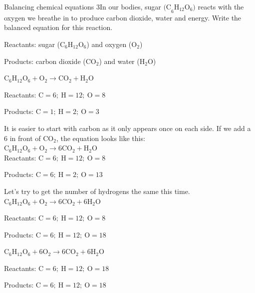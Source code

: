 \begin{wex}{Balancing chemical equations 3}{In our bodies, sugar ${\text{(C}_{6}\text{H}_{12}\text{O}_{6}\text{)}}$ reacts with the oxygen we breathe in to produce carbon dioxide, water and energy. Write the balanced equation for this reaction.}

{
Reactants: sugar (${\text{C}_{6}\text{H}_{12}\text{O}_{6}}$) and oxygen (${\text{O}_{2}}$)

Products: carbon dioxide (${\text{CO}_{2}}$) and water (${\text{H}_{2}\text{O}}$)\\
}
{
    $\text{C}_{6}\text{H}_{12}\text{O}_{6} + \text{O}_{2} \rightarrow \text{CO}_{2} + \text{H}_{2}\text{O}$
}
{
   Reactants: $\text{C} = 6;~ \text{H} = 12; ~\text{O} = 8$

   Products: $\text{C} = 1;~ \text{H} = 2; ~\text{O} = 3$
}
{
   It is easier to start with carbon as it only appears once on each side. If we add a $6$ in front of ${\text{CO}_{2}}$, the equation looks like this:\\
    $\text{C}_{6}\text{H}_{12}\text{O}_{6} + \text{O}_{2} \rightarrow 6\text{CO}_{2} + \text{H}_{2}\text{O}$\\

   Reactants: $\text{C} = 6;~ \text{H} = 12; ~\text{O} = 8$

   Products: $\text{C} = 6;~ \text{H} = 2; ~\text{O} = 13$
}
{
Let's try to get the number of hydrogens the same this time.\\
    $\text{C}_{6}\text{H}_{12}\text{O}_{6} + \text{O}_{2} \rightarrow 6\text{CO}_{2} + 6\text{H}_{2}\text{O}$

   Reactants: $\text{C} = 6;~ \text{H} = 12; ~\text{O} = 8$

   Products: $\text{C} = 6;~ \text{H} = 12; ~\text{O} = 18$
}
{
  $\text{C}_{6}\text{H}_{12}\text{O}_{6} + 6\text{O}_{2} \rightarrow 6\text{CO}_{2} + 6\text{H}_{2}\text{O}$

   Reactants: $\text{C} = 6;~ \text{H} = 12; ~\text{O} = 18$

   Products: $\text{C} = 6;~ \text{H} = 12; ~\text{O} = 18$
}
\end{wex}
